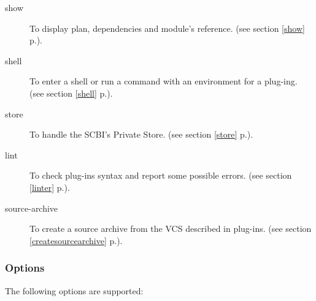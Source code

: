 \documentclass[a4paper,12pt,twoside]{article}
\newcommand{\seeref}[1]{see section \ref{#1} p.\pageref{#1}}
\begin{document}
\begin{description}
	\item[show] To display plan, dependencies and module's reference. (\seeref{show}).

	\item[shell] To enter a shell or run a command with an environment for a plug-ing. (\seeref{shell}).

	\item[store] To handle the SCBI's Private Store. (\seeref{store}).

	\item[lint] To check plug-ins syntax and report some possible errors. (\seeref{linter}).

	\item[source-archive] To create a source archive from the VCS described in plug-ins. (\seeref{createsourcearchive}).
\end{description}

\subsubsection{Options}
\label{cmdline}

The following options are supported:
\end{document}
